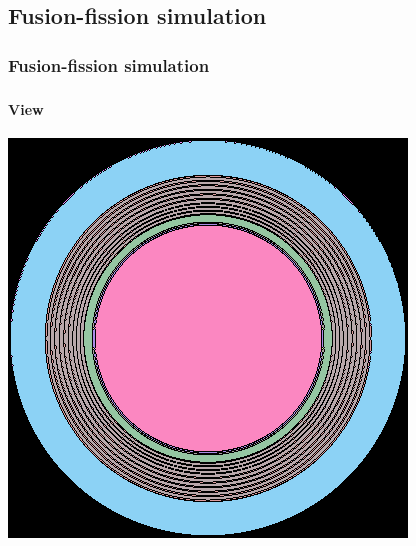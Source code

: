 \documentclass[svgnames,smaller,table]{beamer}
\begin{document}
\subsection{Fusion-fission simulation}
\begin{frame}
  \frametitle{Fusion-fission simulation}
  \framesubtitle{}

\frametitle{}
  \framesubtitle{View}
  \begin{center}
    \includegraphics[scale=0.4]{figuras/fusion.png}
    \label{fusion}
  \end{center}
\end{frame}
\end{document}
